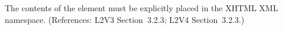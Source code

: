 The contents of the  element must be explicitly placed in the
XHTML XML namespace.  (References: L2V3 Section~3.2.3; L2V4 Section~3.2.3.)
